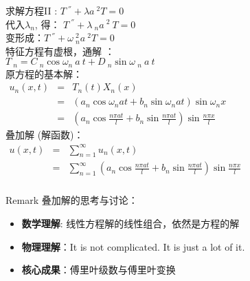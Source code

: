 \begin{frame}
	\frametitle{}	
	求解方程II : 	$\displaystyle  T~^{''} +\lambda {a~^2 T}=0 $ \\ 
	代入$\lambda_n$, 得：
	$\displaystyle  T~^{''} +\lambda~_n a~^2 ~T=0 $ \\
	变形成：$\displaystyle  T~^{''} +\omega ~_n ^2 {a~^2 T}=0 $ \\ 
	特征方程有虚根，通解 ：\\
	\hspace{3cm}	$\displaystyle 	T~_n=C~_n\cos \omega_n~a~t+ D~_n\sin \omega ~_n~a~t $  \\ 
	原方程的基本解：\\
	$\begin{array}{llll}
		u_n(x,t) &=& T_n(t)X_n(x)\\
		&=& (a_n\cos \omega_nat+ b_n\sin \omega _nat ) \sin \omega_n x\\
		&=&(a_n\cos\frac{ n\pi at}{l}+ b_n\sin \frac{ n\pi at}{l}) \sin \frac{ n\pi x}{l}
	\end{array}$ \\ 
	叠加解 (解函数)：\\
 	$\begin{array}{llll}
 		u(x,t) &=&\sum\limits_{n=1}^{\infty } u_n(x,t)\\
 		&=& \sum\limits_{n=1}^{\infty }  (a_n\cos\frac{ n\pi at}{l}+ b_n\sin \frac{ n\pi at}{l}) \sin \frac{ n\pi x}{l}
 	\end{array}$ \\ 
\end{frame}	

\begin{frame}
	\frametitle{}	
	\begin{block} {Remark } 
		叠加解的思考与讨论：
		\begin{itemize}
			\item \textbf {数学理解}: 线性方程解的线性组合，依然是方程的解  
			\item \textbf {物理理解}：It is not complicated. It is just a lot of it. 
			\item \textbf {核心成果}：傅里叶级数与傅里叶变换 
		\end{itemize}
	\end{block}
\end{frame}	

